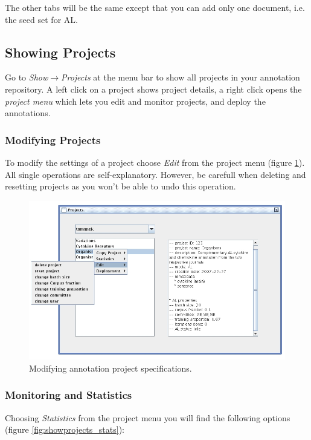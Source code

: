 \documentclass[DIV12,english,11pt,halfparskip]{scrartcl}
\begin{document}
The other tabs will be the same except that you can add only one
document, i.e. the seed set for AL.


\subsection{Showing Projects}

Go to \emph{Show$\rightarrow$Projects} at the menu bar to show all
projects in your annotation repository. A left click on a project
shows project details, a right click opens the \emph{project menu}
which lets you edit and monitor projects, and deploy the annotations.


\subsubsection{Modifying Projects}

To modify the settings of a project choose \emph{Edit} from the
project menu (figure \ref{fig:showprojects_edit}). All single
operations are self-explanatory. However, be carefull when deleting
and resetting projects as you won't be able to undo this operation.

\begin{figure}[h]
  \centering
  \includegraphics[scale=0.5]{figs/ShowProjects_Edit.jpg}
  \caption{Modifying annotation project specifications.}
  \label{fig:showprojects_edit}
\end{figure}

\subsubsection{Monitoring and Statistics}

Choosing \emph{Statistics} from the project menu you will find the
following options (figure \ref{fig:showprojects_stats}):
\end{document}
